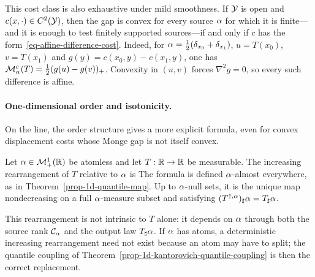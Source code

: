 This cost class is also exhaustive under mild smoothness. If $\mathcal{Y}$ is open and $c(x,\cdot)\in C^2(\mathcal{Y})$, then the gap is convex for every source $\alpha$ for which it is finite---and it is enough to test finitely supported sources---if and only if $c$ has the form~\eqref{eq-affine-difference-cost}. Indeed, for $\alpha=\frac12(\delta_{x_0}+\delta_{x_1})$, $u=T(x_0)$, $v=T(x_1)$ and $g(y)=c(x_0,y)-c(x_1,y)$, one has $\mathcal M_\alpha^c(T)=\frac12(g(u)-g(v))_+$. Convexity in $(u,v)$ forces $\nabla^2g=0$, so every such difference is affine.

\paragraph{One-dimensional order and isotonicity.}

On the line, the order structure gives a more explicit formula, even for convex displacement costs whose Monge gap is not itself convex.

\begin{defn}\label{def-increasing-rearrangement-map}
	Let $\alpha\in\mathcal{M}_+^1(\mathbb{R})$ be atomless and let $T:\mathbb{R}\to\mathbb{R}$ be measurable. The increasing rearrangement of $T$ relative to $\alpha$ is
	The formula is defined $\alpha$-almost everywhere, as in Theorem~\ref{prop-1d-quantile-map}. Up to $\alpha$-null sets, it is the unique map nondecreasing on a full $\alpha$-measure subset and satisfying $(T^{\uparrow,\alpha})_\sharp\alpha=T_\sharp\alpha$.
\end{defn}

This rearrangement is not intrinsic to $T$ alone: it depends on $\alpha$ through both the source rank $\mathcal{C}_{\alpha}$ and the output law $T_\sharp\alpha$. If $\alpha$ has atoms, a deterministic increasing rearrangement need not exist because an atom may have to split; the quantile coupling of Theorem~\ref{prop-1d-kantorovich-quantile-coupling} is then the correct replacement.

